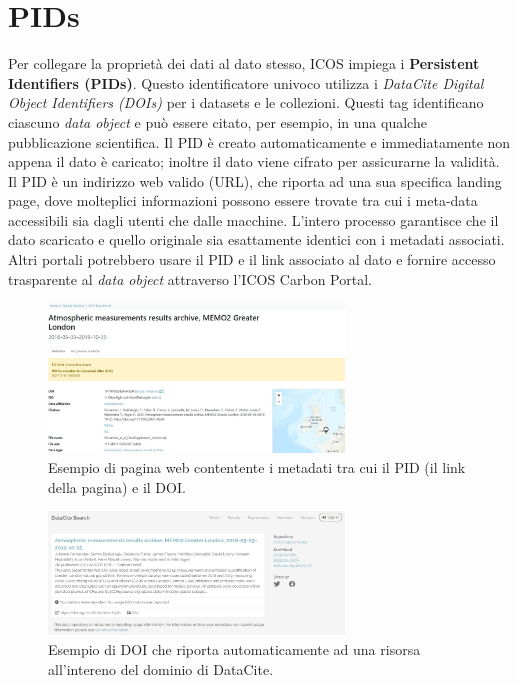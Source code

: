 \section{PIDs}
Per collegare la proprietà dei dati al dato stesso, ICOS impiega i \textbf{Persistent Identifiers (PIDs)}.
Questo identificatore univoco utilizza i \textit{DataCite Digital Object Identifiers (DOIs)} per i datasets
e le collezioni. Questi tag identificano ciascuno \textit{data object} e può essere citato, per esempio,
in una qualche pubblicazione scientifica. Il PID è creato automaticamente e immediatamente
non appena il dato è caricato; inoltre il dato viene cifrato per assicurarne la validità.\\

Il PID è un indirizzo web valido (URL), che riporta ad una sua specifica landing page,
dove molteplici informazioni possono essere trovate tra cui i meta-data accessibili sia
dagli utenti che dalle macchine. L'intero processo garantisce che il dato scaricato e quello
originale sia esattamente identici con i metadati associati. Altri portali 
potrebbero usare il PID e il link associato al dato e fornire accesso trasparente al \textit{data object}
attraverso l'ICOS Carbon Portal.

\begin{figure}[h!]
    \centering
    \includegraphics[width=0.7\textwidth]{figures/PIDex.JPG}
    \caption{Esempio di pagina web contentente i metadati tra cui il PID (il link della pagina) e il DOI.}
    \label{figure:PIDex}
\end{figure}

\begin{figure}[h!]
    \centering
    \includegraphics[width=0.7\textwidth]{figures/DOIex.JPG}
    \caption{Esempio di DOI che riporta automaticamente ad una risorsa all'intereno del dominio di DataCite.}
    \label{figure:DOIex}
\end{figure}


